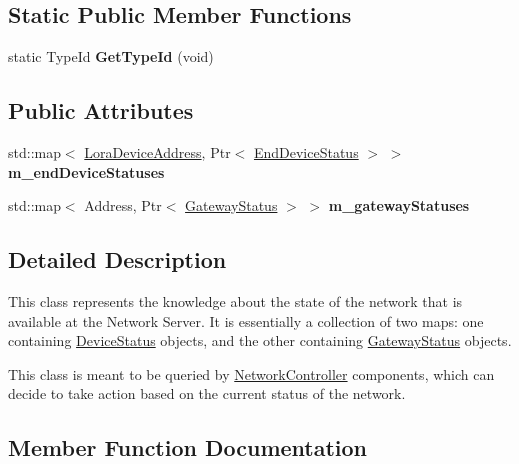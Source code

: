 \subsection*{Static Public Member Functions}
\begin{DoxyCompactItemize}
\item 
\mbox{\label{classns3_1_1lorawan_1_1NetworkStatus_a63a26932edea60efc8e69ad235ffbd11}} 
static Type\+Id {\bfseries Get\+Type\+Id} (void)
\end{DoxyCompactItemize}
\subsection*{Public Attributes}
\begin{DoxyCompactItemize}
\item 
\mbox{\label{classns3_1_1lorawan_1_1NetworkStatus_a75aa2ef5af97d128fb242d15928f72d5}} 
std\+::map$<$ \hyperlink{classns3_1_1lorawan_1_1LoraDeviceAddress}{Lora\+Device\+Address}, Ptr$<$ \hyperlink{classns3_1_1lorawan_1_1EndDeviceStatus}{End\+Device\+Status} $>$ $>$ {\bfseries m\+\_\+end\+Device\+Statuses}
\item 
\mbox{\label{classns3_1_1lorawan_1_1NetworkStatus_aae9b5ba96201394290e23f0a906d74e7}} 
std\+::map$<$ Address, Ptr$<$ \hyperlink{classns3_1_1lorawan_1_1GatewayStatus}{Gateway\+Status} $>$ $>$ {\bfseries m\+\_\+gateway\+Statuses}
\end{DoxyCompactItemize}


\subsection{Detailed Description}
This class represents the knowledge about the state of the network that is available at the Network Server. It is essentially a collection of two maps\+: one containing \hyperlink{classns3_1_1lorawan_1_1DeviceStatus}{Device\+Status} objects, and the other containing \hyperlink{classns3_1_1lorawan_1_1GatewayStatus}{Gateway\+Status} objects.

This class is meant to be queried by \hyperlink{classns3_1_1lorawan_1_1NetworkController}{Network\+Controller} components, which can decide to take action based on the current status of the network. 

\subsection{Member Function Documentation}
\mbox{\label{classns3_1_1lorawan_1_1NetworkStatus_aaf864a8020870ec04cefe03232541dd5}} 
